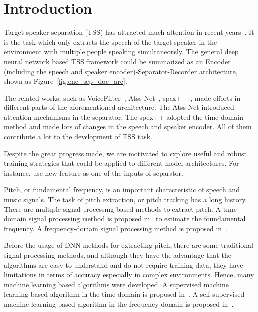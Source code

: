 

\section{Introduction}
\label{sec:intro}

Target speaker separation (TSS) has attracted much attention in recent years~\cite{speakerBeam, compact_speakerbeam, voicefilter, li20p_interspeech, time_domain_speaker_ex_net, spex, spex+, speakerfilter, speakerfilter_pro}.
It is the task which only extracts the speech of the target speaker in the environment with multiple people speaking simultaneously.
The general deep neural network based TSS framework could be summarized as an Encoder (including the speech and speaker encoder)-Separator-Decorder architecture, shown as Figure~\ref{fig:enc_sep_doc_arc}.

The related works, such as VoiceFilter~\cite{voicefilter}, Atss-Net~\cite{li20p_interspeech}, spex++~\cite{time_domain_speaker_ex_net, spex, spex+}, made efforts in different parts of the aforementioned architecture. The Atss-Net introduced attention mechanisms in the separator. The spex++ adopted the time-domain method and made lots of changes in the speech and speaker encoder. All of them contribute a lot to the development of TSS task.

Despite the great progress made, we are motivated to explore useful and robust training strategies that could be applied to different model architectures. For instance, use new feature as one of the inputs of separator.

Pitch, or fundamental frequency, is an important characteristic of speech and music signals.
The task of pitch extraction, or pitch tracking has a long history. There are multiple signal processing based methods to extract pitch. A time domain signal processing method is proposed in~\cite{yin} to estimate the foundamental frequency.
A frequency-domain signal processing method is proposed in~\cite{swipe}.

Before the usage of DNN methods for extracting pitch, there are some traditional signal processing methods, and although they have the advantage that the algorithms are easy to understand and do not require training data, they have limitations in terms of accuracy especially in complex environments.
Hence, many machine learning based algorithms were developed. A supervised machine learning based algorithm in the time domain is proposed in~\cite{crepe}.
A self-supervised machine learning based algorithm in the frequency domain is proposed in~\cite{spice}.

